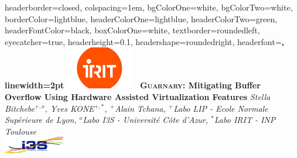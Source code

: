 \documentclass[landscape,a0paper,fontscale=0.3]{baposter} %
\begin{document}
\begin{poster}
{
headerborder=closed, %
colspacing=1em, %
bgColorOne=white, %
bgColorTwo=white, %
borderColor=lightblue, %
headerColorOne=lightblue, %
headerColorTwo=green, %
headerFontColor=black, %
boxColorOne=white, %
textborder=roundedleft, %
eyecatcher=true, %
headerheight=0.1\textheight, %
headershape=roundedright, %
headerfont=\Large\bf\textsc, %
linewidth=2pt %
}
%
{\includegraphics[height=5em]{irit.png}} %
%
{\bf\LARGE\ \textsc{Guarnary}: Mitigating Buffer Overflow Using Hardware Assisted Virtualization Features} %
{\textsl{\small Stella Bitchebe$^{+,o}$, Yves KONE$^{+,*}$, $^{+}$Alain Tchana, $^{+}$Labo LIP - Ecole Normale Sup\'erieure de Lyon, $^{o}$Labo I3S - Université Côte d'Azur, $^{*}$Labo IRIT - INP Toulouse}\\ \vspace{0.2em}
\includegraphics[height=2em]{I3S.png}
\hspace*{6em}
}
\end{poster}
\end{document}
